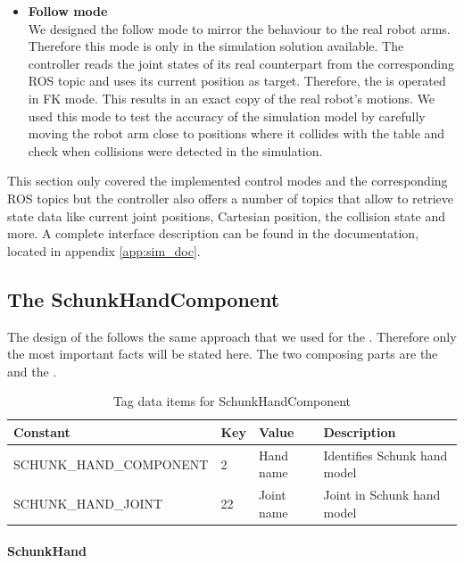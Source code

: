 \begin{itemize}
\item \textbf{Follow mode} \\
We designed the follow mode to mirror the behaviour to the real robot arms. Therefore this mode is only in the  simulation solution available. The controller reads the joint states of its real counterpart from the corresponding ROS topic and uses its current position as target. Therefore, the  is operated in FK mode. This results in an exact copy of the real robot's motions. We used this mode to test the accuracy of the simulation model by carefully moving the robot arm close to positions where it collides with the table and check when collisions were detected in the simulation. 

\end{itemize}

This section only covered the implemented control modes and the corresponding ROS topics but the controller also offers a number of topics that allow to retrieve state data like current joint positions, Cartesian position, the collision state and more. A complete interface description can be found in the documentation, located in appendix \ref{app:sim_doc}.

\subsection{The SchunkHandComponent}

The design of the  follows the same approach that we used for the . Therefore only the most important facts will be stated here. The two composing parts are the  and the .

\begin{table}[h]
  \centering
  \begin{tabularx}{\textwidth}{|l|l|l|X|} \hline
	\textbf{Constant} & \textbf{Key} & \textbf{Value} & \textbf{Description} \\ \hline
	SCHUNK\_HAND\_COMPONENT & 2 & Hand name & Identifies Schunk hand model \\
	SCHUNK\_HAND\_JOINT & 22 & Joint name & Joint in Schunk hand model \\ \hline
  \end{tabularx}
  \caption{Tag data items for SchunkHandComponent}
  \label{fig:schunk_tags}
\end{table}

\paragraph{SchunkHand}

